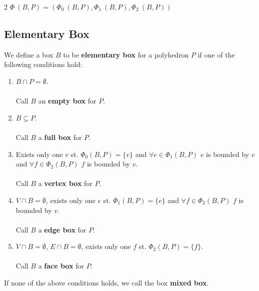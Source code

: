 \documentclass[twoside]{article}
\begin{document}
\begin{multicols}{2}
$\Phi\ (B, P) = ( \Phi_0\ (B, P), \Phi_1\ (B, P), \Phi_2\ (B, P) )$

\subsection{Elementary Box}
	We define a box $B$ to be \textbf{elementary box} for a polyhedron $P$ if one of the following conditions hold: 
		\begin{enumerate} 
           		\item $B\cap P=\emptyset$. 
           		\\
           		\\
           		Call $B$ an \textbf{empty box} for $P$.
           		\item $B \subseteq P$. 
           		\\
           		\\
           		Call $B$ a \textbf{full box} for $P$.
            	\item Exists only one $v$ st. $\Phi_0(B,P)=\{v\}$ and $\forall e \in \Phi_1(B,P)$ $e$ is bounded by $v$ and $\forall f \in \Phi_2(B,P)$ $f$ is bounded by $v$.
            	\\
            	\\
            	Call $B$ a \textbf{vertex box} for $P$.

            		\item $V \cap B = \emptyset$, exists only one $e$ st. $\Phi_1(B,P)=\{e\}$ and $\forall f \in \Phi_2(B,P)$ $f$ is bounded by $v$.
            		\\
            		\\ 
            		Call $B$ a \textbf{edge box} for $P$. 

            		\item $V \cap B = \emptyset$, $E \cap B = \emptyset$, exists only one $f$ st. $\Phi_2(B,P)=\{f\}$.
            		\\
            		\\
            		Call $B$ a \textbf{face box} for $P$.

                  \end{enumerate}
   \indent If none of the above conditions holds, we call the box \textbf{mixed box}.

\end{multicols}
\end{document}
